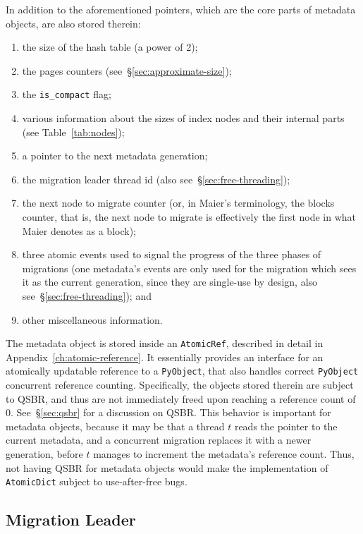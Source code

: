 In addition to the aforementioned pointers, which are the core parts of metadata objects, are also stored therein:
\begin{enumerate}
    \item the size of the hash table (a power of 2);
    \item the pages counters (see~\S\ref{sec:approximate-size});
    \item the \texttt{is\_compact} flag;
    \item various information about the sizes of index nodes and their internal parts (see Table~\ref{tab:nodes});
    \item a pointer to the next metadata generation;
    \item the migration leader thread id (also see~\S\ref{sec:free-threading});
    \item the next node to migrate counter (or, in Maier's terminology, the blocks counter, that is, the next node to migrate is effectively the first node in what Maier denotes as a block);
    \item three atomic events used to signal the progress of the three phases of migrations (one metadata's events are only used for the migration which sees it as the current generation, since they are single-use by design, also see~\S\ref{sec:free-threading}); and
    \item other miscellaneous information.
\end{enumerate}

The metadata object is stored inside an \texttt{AtomicRef}, described in detail in Appendix~\ref{ch:atomic-reference}.
It essentially provides an interface for an atomically updatable reference to a \texttt{PyObject}, that also handles correct \texttt{PyObject} concurrent reference counting.
Specifically, the objects stored therein are subject to QSBR, and thus are not immediately freed upon reaching a reference count of 0.
See~\S\ref{sec:qsbr} for a discussion on QSBR\@.
This behavior is important for metadata objects, because it may be that a thread $t$ reads the pointer to the current metadata, and a concurrent migration replaces it with a newer generation, before $t$ manages to increment the metadata's reference count.
Thus, not having QSBR for metadata objects would make the implementation of \texttt{AtomicDict} subject to use-after-free bugs.

\subsection{Migration Leader}\label{subsec:migration-leader}

